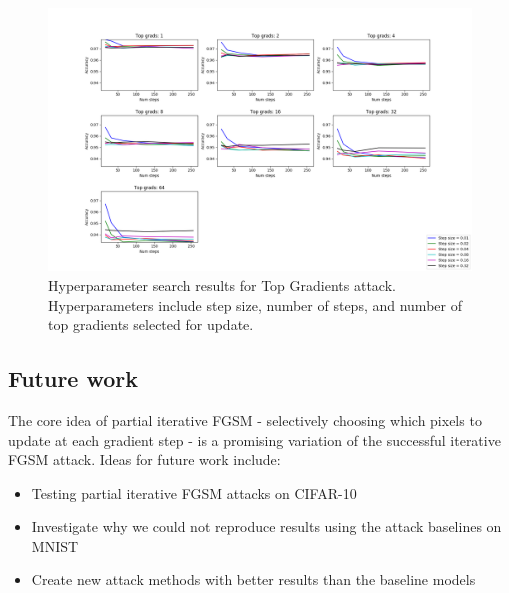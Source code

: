 \begin{figure}
    \centering
    \includegraphics[width=\textwidth]{Report/sections/images/hyperparameter-search.png}
    \caption{Hyperparameter search results for Top Gradients attack. Hyperparameters include step size, number of steps, and number of top gradients selected for update.}
    \label{fig:hyperparam_search}
\end{figure}

\subsection{Future work}
The core idea of partial iterative FGSM - selectively choosing which pixels to update at each gradient step - is a promising variation of the successful iterative FGSM attack. Ideas for future work include: 

\begin{itemize}
\item Testing partial iterative FGSM attacks on CIFAR-10
\item Investigate why we could not reproduce results using the attack baselines on MNIST
\item Create new attack methods with better results than the baseline models

\end{itemize}
